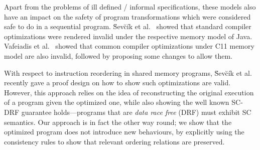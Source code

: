 

Apart from the problems of ill defined / informal specifications, these models also have an impact on the safety of program transformations which were considered safe to do in a sequential program. \u{S}ev\u{c}\'{i}k et al.~\cite{SevcikJ} showed that standard compiler optimizations were rendered invalid under the respective memory model of Java. Vafeiadis et al.~\cite{VafeiadisV} showed that common compiler optimizations under C11 memory model are also invalid, followed by proposing some changes to allow them. 
   
With respect to instruction reordering in shared memory programs, \u{S}ev\u{c}\'{i}k et al.~\cite{Sevcik2} recently gave a proof design on how to show such optimizations are valid. However, this approach relies on the idea of reconstructing the original execution of a program given the optimized one, while also showing the well known SC-DRF guarantee holds---programs that are \textit{data race free} (DRF) must exhibit SC semantics. Our approach is in fact the other way round; we show that the optimized program does not introduce new behaviours, by explicitly using the consistency rules to show that relevant ordering relations are preserved.